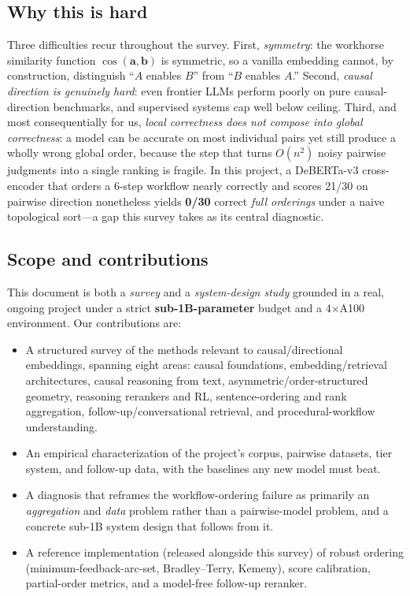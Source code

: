 \subsection{Why this is hard}
Three difficulties recur throughout the survey. First, \emph{symmetry}: the workhorse
similarity function $\cos(\mathbf{a},\mathbf{b})$ is symmetric, so a vanilla embedding
cannot, by construction, distinguish ``$A$ enables $B$'' from ``$B$ enables $A$.''
Second, \emph{causal direction is genuinely hard}: even frontier LLMs perform poorly on
pure causal-direction benchmarks, and supervised systems cap well below ceiling. Third,
and most consequentially for us, \emph{local correctness does not compose into global
correctness}: a model can be accurate on most individual pairs yet still produce a wholly
wrong global order, because the step that turns $O(n^2)$ noisy pairwise judgments into a
single ranking is fragile. In this project, a DeBERTa-v3 cross-encoder that orders a
6-step workflow nearly correctly and scores 21/30 on pairwise direction nonetheless
yields \textbf{0/30} correct \emph{full orderings} under a naive topological sort---a
gap this survey takes as its central diagnostic.

\subsection{Scope and contributions}
This document is both a \emph{survey} and a \emph{system-design study} grounded in a
real, ongoing project under a strict \textbf{sub-1B-parameter} budget and a
4$\times$A100 environment. Our contributions are:

\begin{itemize}[leftmargin=1.4em,itemsep=0.15em]
  \item A structured survey of the methods relevant to causal/directional embeddings,
  spanning eight areas: causal foundations, embedding/retrieval architectures, causal
  reasoning from text, asymmetric/order-structured geometry, reasoning rerankers and RL,
  sentence-ordering and rank aggregation, follow-up/conversational retrieval, and
  procedural-workflow understanding.
  \item An empirical characterization of the project's corpus, pairwise datasets, tier
  system, and follow-up data, with the baselines any new model must beat.
  \item A diagnosis that reframes the workflow-ordering failure as primarily an
  \emph{aggregation} and \emph{data} problem rather than a pairwise-model problem, and a
  concrete sub-1B system design that follows from it.
  \item A reference implementation (released alongside this survey) of robust ordering
  (minimum-feedback-arc-set, Bradley--Terry, Kemeny), score calibration, partial-order
  metrics, and a model-free follow-up reranker.
\end{itemize}


